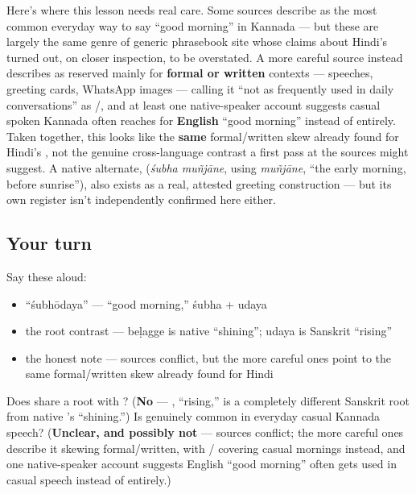 \begin{culture}
Here's where this lesson needs real care. Some sources describe \textbf{} as the most common everyday way to say \textquotedblleft{}good morning\textquotedblright{} in Kannada — but these are largely the same genre of generic phrasebook site whose claims about Hindi's  turned out, on closer inspection, to be overstated. A more careful source instead describes  as reserved mainly for \textbf{formal or written} contexts — speeches, greeting cards, WhatsApp images — calling it \textquotedblleft{}not as frequently used in daily conversations\textquotedblright{} as \textbf{}/\textbf{}, and at least one native-speaker account suggests casual spoken Kannada often reaches for \textbf{English} \textquotedblleft{}good morning\textquotedblright{} instead of  entirely. Taken together, this looks like the \textbf{same} formal/written skew already found for Hindi's , not the genuine cross-language contrast a first pass at the sources might suggest. A native alternate, \textbf{ } (\emph{śubha muñjāne}, using \emph{muñjāne}, \textquotedblleft{}the early morning, before sunrise\textquotedblright{}), also exists as a real, attested greeting construction — but its own register isn't independently confirmed here either.
\end{culture}

\subsection*{Your turn}
Say these aloud:

\begin{itemize}
\raggedright
  \item \textquotedblleft{}śubhōdaya\textquotedblright{} — \textquotedblleft{}good morning,\textquotedblright{} śubha + udaya
  \item the root contrast — beḷagge is native \textquotedblleft{}shining\textquotedblright{}; udaya is Sanskrit \textquotedblleft{}rising\textquotedblright{}
  \item the honest note — sources conflict, but the more careful ones point to the same formal/written skew already found for Hindi
\end{itemize}

\begin{tcolorbox}[breakable,colback=teal!4,colframe=teal!35!black,title={Before you move on}]
Does  share a root with ? (\textbf{No} — , \textquotedblleft{}rising,\textquotedblright{} is a completely different Sanskrit root from native 's \textquotedblleft{}shining.\textquotedblright{}) Is  genuinely common in everyday casual Kannada speech? (\textbf{Unclear, and possibly not} — sources conflict; the more careful ones describe it skewing formal/written, with / covering casual mornings instead, and one native-speaker account suggests English \textquotedblleft{}good morning\textquotedblright{} often gets used in casual speech instead of  entirely.)
\end{tcolorbox}
